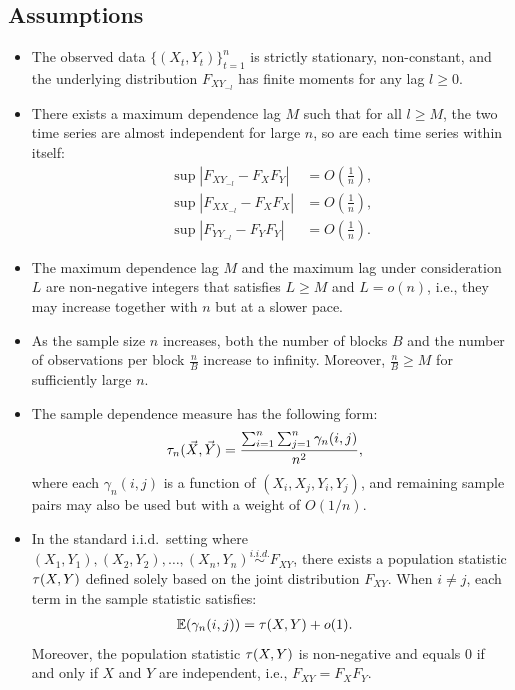 \subsection{Assumptions}
\label{sec:assump}
\begin{itemize}
\item The observed data $\{(X_t, Y_t)\}_{t=1}^{n}$ is strictly stationary, non-constant, and the underlying distribution $F_{XY_{-l}}$ has finite moments for any lag $l \geq 0$. 
\item There exists a maximum dependence lag $M$ such that for all $l \geq M$, the two time series are almost independent for large $n$, so are each time series within itself:
    \begin{align*}
        \sup|F_{X Y_{-l}} - F_{X}F_{Y}| &= O(\frac{1}{n}) ,\\
        \sup|F_{X X_{-l}} - F_{X}F_{X}| &= O(\frac{1}{n}) ,\\
        \sup|F_{Y Y_{-l}} - F_{Y}F_{Y}| &= O(\frac{1}{n}) .
    \end{align*}
\item The maximum dependence lag $M$ and the maximum lag under consideration $L$ are non-negative integers that satisfies $L \geq M$ and $L=o(n)$, i.e., they may increase together with $n$ but at a slower pace.
\item As the sample size $n$ increases, both the number of blocks $B$ and the number of observations per block $\frac{n}{B}$ increase to infinity. Moreover, $\frac{n}{B} \geq M$ for sufficiently large $n$.
\item The sample dependence measure has the following form:
\begin{align*}
        \tau_{n}(\vec{X},\vec{Y}) &=\frac{\sum_{i=1}^{n}\sum_{j=1}^{n} \gamma_{n}(i,j)}{n^2},
    \end{align*} 
    where each $\gamma_{n}(i,j)$ is a function of $(X_i,X_j, Y_i,Y_j)$, and remaining sample pairs may also be used but with a weight of $O(1/n)$.
\item In the standard i.i.d.~setting where $(X_1,Y_1), (X_2, Y_2),\ldots, (X_n, Y_n) \stackrel{i.i.d.}{\sim} F_{XY}$, there exists a population statistic $\tau(X, Y)$ defined solely based on the joint distribution $F_{XY}$. When $i \neq j$, each term in the sample statistic satisfies:
\begin{align*}
        \mathbb{E}(\gamma_{n}(i,j)) &= \tau(X, Y) + o(1).
    \end{align*} 
    Moreover, the population statistic $\tau(X, Y)$ is non-negative and equals $0$ if and only if $X$ and $Y$ are independent, i.e., $F_{XY}=F_{X} F_{Y}$.
\end{itemize}

